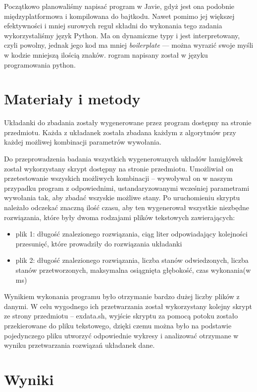 \documentclass{classrep}
\begin{document}
Początkowo planowaliśmy napisać program w Javie, gdyż jest ona podobnie międzyplatformowa i kompilowana do bajtkodu.
Nawet pomimo jej większej efektywności i mniej surowych reguł składni do wykonania tego zadania wykorzystaliśmy język Python.
Ma on dynamiczne typy i jest interpretowany, czyli powolny, jednak jego kod ma mniej \emph{boilerplate} --- można wyrazić swoje myśli w kodzie mniejszą ilością znaków.
rogram napisany został w języku programowania python. 

\section{Materiały i metody}
Układanki do zbadania zostały wygenerowane przez program dostępny na stronie przedmiotu. Każda z układanek została zbadana każdym z algorytmów przy każdej możliwej kombinacji parametrów wywołania. 

Do przeprowadzenia badania wszystkich wygenerowanych układów łamigłówek został wykorzystany skrypt dostępny na stronie przedmiotu. Umożliwiał on przetestowanie wszyskich możliwych kombinacji – wywoływał on w naszym przypadku program z odpowiednimi, ustandaryzowanymi wcześniej parametrami wywołania tak, aby zbadać wszyskie możliwe stany. Po uruchomieniu skryptu należało odczekać znaczną ilość czasu, aby ten wygenerował wszystkie niezbędne rozwiązania, które były dwoma rodzajami plików tekstowych zawierających:

\begin{itemize}
    \item plik 1: długość znalezionego rozwiązania, ciąg liter odpowiadający kolejności przesunięć, które prowadziły do rozwiązania układanki
    \item plik 2: długość znalezionego rozwiązania, liczba stanów odwiedzonych, liczba stanów przetworzonych, maksymalna osiągnięta głębokość, czas wykonania(w ms)
\end{itemize}

Wynikiem wykonania programu było otrzymanie bardzo dużej liczby plików z danymi. W celu wygodnego ich przetwarzania został wykorzystany kolejny skrypt ze strony przedmiotu – exdata.sh, wyjście skryptu za pomocą potoku zostało przekierowane do pliku tekstowego, dzięki czemu można było na podstawie pojedynczego pliku utworzyć odpowiednie wykresy i analizować otrzymane w wyniku przetwarzania rozwiązań układanek dane.

\section{Wyniki}
\end{document}
